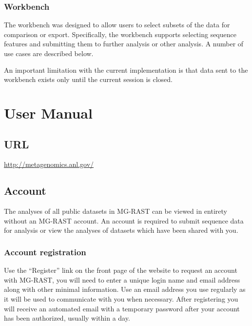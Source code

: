 \documentclass[12pt,fullpage]{report}
\begin{document}
\subsection{Workbench}
The workbench was designed to allow users to select subsets of the data for comparison or export.
Specifically, the workbench supports selecting sequence features and submitting them to further analysis or other analysis. A number of use cases are described below.

An important limitation with the current implementation is that data sent to the workbench exists only until the current session is closed.
\chapter{User Manual}
\section{URL}
\url{http://metagenomics.anl.gov/}
\section{Account}
The analyses of all public datasets in MG-RAST can be viewed in entirety without an MG-RAST account. An account is required to submit sequence data
for analysis or view the analyses of datasets which have been shared with you.
\subsection{Account registration}
Use the ``Register'' link on the front page of the website to request an account with MG-RAST, you will need to enter a unique login name and email address
along with other minimal information. Use an email address you use regularly as it will be used to communicate with you when necessary. After registering
you will receive an automated email with a temporary password after your account has been authorized, usually within a day.
\end{document}
